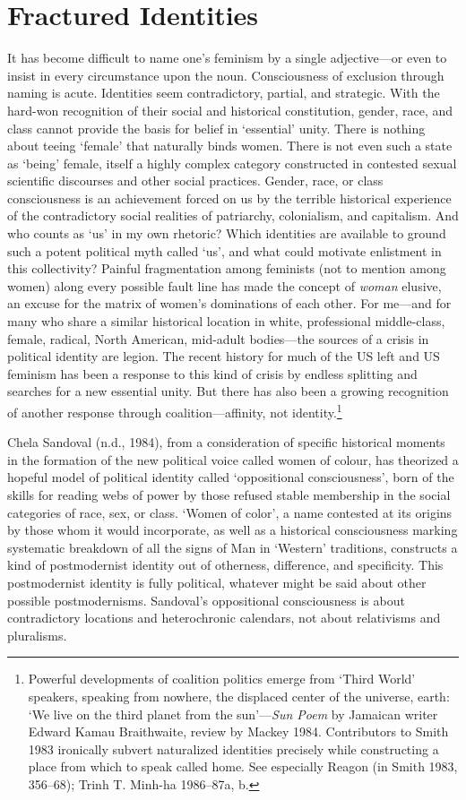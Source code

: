 \documentclass[DIV=12,%
               BCOR=10mm,%
               headinclude=false,%
               footinclude=false,open=any,%
               fontsize=11pt,%
               twoside,%
               paper=210mm:11in]%
               {scrbook}
\begin{document}
\chapter{Fractured Identities}


It has become difficult to name one’s feminism by a single adjective—or even to insist in every circumstance upon the noun. Consciousness of exclusion through naming is acute. Identities seem contradictory, partial, and strategic. With the hard-won recognition of their social and historical constitution, gender, race, and class cannot provide the basis for belief in ‘essential’ unity. There is nothing about teeing ‘female’ that naturally binds women. There is not even such a state as ‘being’ female, itself a highly complex category constructed in contested sexual scientific discourses and other social practices. Gender, race, or class consciousness is an achievement forced on us by the terrible historical experience of the contradictory social realities of patriarchy, colonialism, and capitalism. And who counts as ‘us’ in my own rhetoric? Which identities are available to ground such a potent political myth called ‘us’, and what could motivate enlistment in this collectivity? Painful fragmentation among feminists (not to mention among women) along every possible fault line has made the concept of \emph{woman} elusive, an excuse for the matrix of women’s dominations of each other. For me—and for many who share a similar historical location in white, professional middle-class, female, radical, North American, mid-adult bodies—the sources of a crisis in political identity are legion. The recent history for much of the US left and US feminism has been a response to this kind of crisis by endless splitting and searches for a new essential unity. But there has also been a growing recognition of another response through coalition—affinity, not identity.\footnote{Powerful developments of coalition politics emerge from ‘Third World’ speakers, speaking from nowhere, the displaced center of the universe, earth: ‘We live on the third planet from the sun’—\emph{Sun Poem} by Jamaican writer Edward Kamau Braithwaite, review by Mackey 1984. Contributors to Smith 1983 ironically subvert naturalized identities precisely while constructing a place from which to speak called home. See especially Reagon (in Smith 1983, 356–68); Trinh T. Minh-ha 1986–87a, b.}


Chela Sandoval (n.d., 1984), from a consideration of specific historical moments in the formation of the new political voice called women of colour, has theorized a hopeful model of political identity called ‘oppositional consciousness’, born of the skills for reading webs of power by those refused stable membership in the social categories of race, sex, or class. ‘Women of color’, a name contested at its origins by those whom it would incorporate, as well as a historical consciousness marking systematic breakdown of all the signs of Man in ‘Western’ traditions, constructs a kind of postmodernist identity out of otherness, difference, and specificity. This postmodernist identity is fully political, whatever might be said about other possible postmodernisms. Sandoval’s oppositional consciousness is about contradictory locations and heterochronic calendars, not about relativisms and pluralisms.
\end{document}
